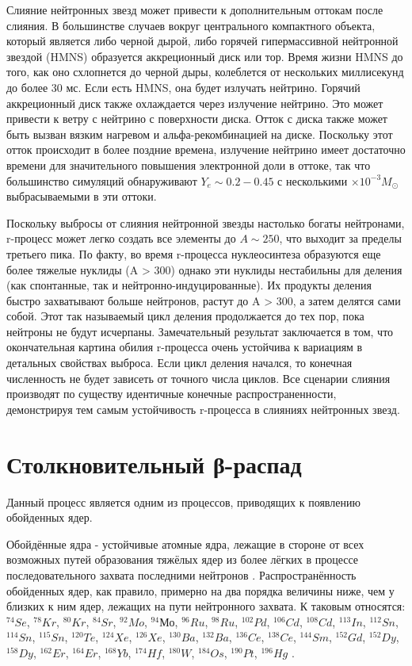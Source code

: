 \documentclass[14pt, a4paper]{article}
\numberwithin{figure}{section}
\numberwithin{equation}{section}
\begin{document}
Слияние нейтронных звезд может привести к дополнительным оттокам после слияния. В большинстве случаев вокруг центрального компактного объекта, который является либо черной дырой, либо горячей гипермассивной нейтронной звездой (HMNS) образуется аккреционный диск или тор. Время жизни HMNS до того, как оно схлопнется до черной дыры, колеблется от нескольких миллисекунд до более 30 мс. Если есть HMNS, она будет излучать нейтрино. Горячий аккреционный диск также охлаждается через излучение нейтрино. Это может привести к ветру с нейтрино с поверхности диска. Отток с диска также может быть вызван вязким нагревом и альфа-рекомбинацией на диске. Поскольку этот отток происходит в более поздние времена, излучение нейтрино имеет достаточно времени для значительного повышения электронной доли в оттоке, так что большинство симуляций обнаруживают $Y_e \sim 0. 2 - 0.45$ с несколькими $\times 10^{-3} M_\odot$ выбрасываемыми в эти оттоки.

Поскольку выбросы от слияния нейтронной звезды настолько богаты нейтронами,  r-процесс может легко создать все элементы до $A \sim 250$, что выходит за пределы третьего пика. По факту, во время r-процесса нуклеосинтеза образуются еще более тяжелые нуклиды (A > 300) однако эти нуклиды нестабильны для деления (как спонтанные, так и нейтронно-индуцированные). Их продукты деления быстро захватывают больше нейтронов, растут до A > 300, а затем делятся сами собой. Этот так называемый цикл деления продолжается до тех пор, пока нейтроны не будут исчерпаны. Замечательный результат заключается в том, что окончательная картина обилия r-процесса очень устойчива к вариациям в детальных свойствах выброса. Если цикл деления начался, то конечная численность не будет зависеть от точного числа циклов. Все сценарии слияния производят по существу идентичные конечные распространенности, демонстрируя тем самым устойчивость r-процесса в слияниях нейтронных звезд.

\section{Столкновительный β-распад}
Данный процесс является одним из процессов, приводящих к появлению обойденных ядер.

Обойдённые ядра - устойчивые атомные ядра, лежащие в стороне от всех возможных путей образования тяжёлых ядер из более лёгких в процессе последовательного захвата последними нейтронов \cite{reactions}. Распространённость обойденных ядер, как правило, примерно на два порядка величины ниже, чем у близких к ним ядер, лежащих на пути нейтронного захвата. К таковым относятся: $^{74}Se$, $^{78}Kr$, $^{80}Kr$, $^{84}Sr$, $^{92}Mo$, $^{94}Мо$, $^{96}Ru$, $^{98}Ru$, $^{102}Pd$, $^{106}Cd$, $^{108}Cd$, $^{113}In$, $^{112}Sn$, $^{114}Sn$, $^{115}Sn$, $^{120}Te$, $^{124}Xe$, $^{126}Xe$, $^{130}Ba$, $^{132}Ba$, $^{136}Ce$, $^{138}Ce$, $^{144}Sm$, $^{152}Gd$, $^{152}Dy$, $^{158}Dy$, $^{162}Er$, $^{164}Er$, $^{168}Yb$, $^{174}Hf$, $^{180}W$, $^{184}Os$, $^{190}Pt$, $^{196}Hg$ \cite{role}.
\end{document}
